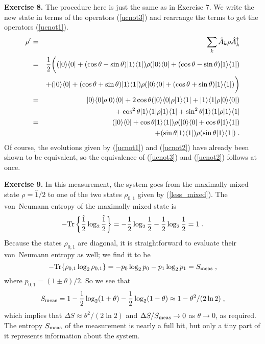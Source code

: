 \documentclass[12pt]{article}
\def\bra#1{{\langle #1 |}}
\def\ket#1{{| #1 \rangle}}
\def\id{{\hat 1}}
\def\tr{{\rm Tr}}
\def\A{{\hat A}}
\def\Adag{{\hat A^\dagger}}
\begin{document}
{\bf Exercise 8.}  The procedure here is just the same as in Exercise 7.
We write the new state in terms of the operators (\ref{ucnot3}) and
rearrange the terms to get the operators (\ref{ucnot1}).
\begin{eqnarray}
\rho' &=& \sum_k \A_k \rho \Adag_k \nonumber\\
&=& {1\over2}\biggl( (\ket0\bra0 + (\cos\theta-\sin\theta)\ket1\bra1 )
  \rho (\ket0\bra0 + (\cos\theta-\sin\theta)\ket1\bra1 ) \nonumber\\
&& + (\ket0\bra0 + (\cos\theta+\sin\theta)\ket1\bra1 )\rho
  (\ket0\bra0 + (\cos\theta+\sin\theta)\ket1\bra1) \biggr) \nonumber\\
&=& \ket0\bra0\rho\ket0\bra0 + 2\cos\theta(\ket0\bra0\rho\ket1\bra1
  + \ket1\bra1\rho\ket0\bra0 ) \nonumber\\
&& + \cos^2\theta \ket1\bra1\rho\ket1\bra1
  + \sin^2\theta \ket1\bra1\rho\ket1\bra1 \nonumber\\
&=& (\ket0\bra0 + \cos\theta\ket1\bra1) \rho
  (\ket0\bra0 + \cos\theta\ket1\bra1) \nonumber\\
&& + (\sin\theta\ket1\bra1)\rho(\sin\theta\ket1\bra1) \;. \nonumber
\end{eqnarray}
Of course, the evolutions given by (\ref{ucnot1}) and (\ref{ucnot2})
have already been shown to be equivalent, so the equivalence of
(\ref{ucnot3}) and (\ref{ucnot2}) follows at once.

{\bf Exercise 9.}  In this measurement, the system goes from the maximally
mixed state $\rho = \id/2$ to one of the two states $\rho_{0,1}$ given
by (\ref{less_mixed}).  The von~Neumann entropy of the maximally mixed
state is
\[
-\tr\left\{ {\id\over2}\log_2{\id\over2} \right\} =
  - {1\over2}\log_2{1\over2} - {1\over2}\log_2{1\over2} = 1 \;.
\]
Because the states $\rho_{0,1}$ are diagonal, it is straightforward to
evaluate their von~Neumann entropy as well; we find it to be
\[
-\tr\{\rho_{0,1}\log_2\rho_{0,1}\} = - p_0 \log_2 p_0 - p_1 \log_2 p_1
  = S_{\rm meas} \;,
\]
where $p_{0,1} = (1 \pm \theta)/2$.  So we see that
\[
S_{\rm meas} = 1 - {1\over2}\log_2(1+\theta) - {1\over2}\log_2(1-\theta)
  \approx 1 - \theta^2/(2\ln2) \;,
\]
which implies that $\Delta S \approx \theta^2/(2\ln2)$ and
$\Delta S/S_{\rm meas} \rightarrow 0$ as $\theta \rightarrow 0$, as required.
The entropy $S_{\rm meas}$ of the measurement is nearly a full bit, but
only a tiny part of it represents information about the system.
\end{document}
